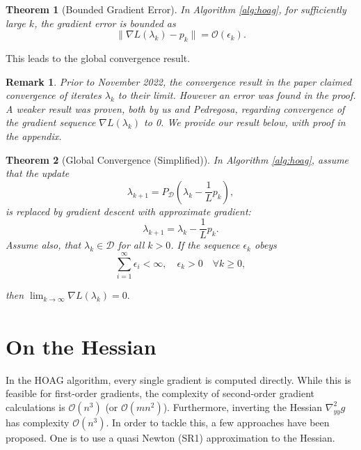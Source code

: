 \documentclass[11pt, twoside]{report}
\newtheorem{theorem}{Theorem}[section]
\newtheorem{remark}{Remark}[theorem]
\begin{document}
\begin{theorem}[Bounded Gradient Error] \label{thm_appgrad_hoag}
In Algorithm \ref{alg:hoag}, for sufficiently large $k$, the gradient error is bounded as
\[\|\nabla L(\lambda_k) - p_k\| = \mathcal{O}(\epsilon_k).\]
\end{theorem}

This leads to the global convergence result.

\begin{remark} \label{hoag_mistake}
    Prior to November 2022, the convergence result in the paper\cite{pedregosa2016hyperparameter} claimed convergence of iterates $\lambda_k$ to their limit. However an error was found in the proof. A weaker result was proven, both by us and Pedregosa, regarding convergence of the gradient sequence $\nabla L(\lambda_k)$ to 0. We provide our result below, with proof in the appendix.
\end{remark}

\begin{theorem}[Global Convergence (Simplified)] \label{hoag_thm_simplified}
In Algorithm \ref{alg:hoag}, assume that the update
\[\lambda_{k+1} = P_\mathcal{D} \left( \lambda_k - \frac{1}{L}p_k \right),\]
is replaced by gradient descent with approximate gradient:
\[\lambda_{k+1} = \lambda_k - \frac{1}{L}p_k.\]
Assume also, that $\lambda_k \in \mathcal{D}$ for all $k>0$. If the sequence $\epsilon_k$ obeys
\[\sum_{i=1}^\infty \epsilon_i < \infty, \quad \epsilon_k > 0 \quad \forall k \geq 0,\]

then $\lim_{k \xrightarrow[]{} \infty} \nabla L(\lambda_k) = 0.$
\end{theorem}

\section{On the Hessian}
In the HOAG algorithm, every single gradient is computed directly. While this is feasible for first-order gradients, the complexity of second-order gradient calculations is $\mathcal{O}(n^3)$ (or $\mathcal{O}(mn^2)$). Furthermore, inverting the Hessian $\nabla^2_{yy} g$ has complexity $\mathcal{O}(n^3)$. In order to tackle this, a few approaches have been proposed. One is to use a quasi Newton (SR1) approximation to the Hessian.
\end{document}
